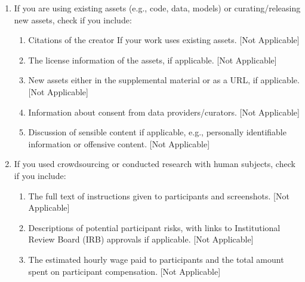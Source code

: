 \documentclass[twoside]{article}
\theoremstyle{plain}
\theoremstyle{definition}
\theoremstyle{plain}
\begin{document}
\begin{enumerate}
  \item If you are using existing assets (e.g., code, data, models) or curating/releasing new assets, check if you include:
  \begin{enumerate}
    \item Citations of the creator If your work uses existing assets. [Not Applicable]
    \item The license information of the assets, if applicable. [Not Applicable]
    \item New assets either in the supplemental material or as a URL, if applicable. [Not Applicable]
    \item Information about consent from data providers/curators. [Not Applicable]
    \item Discussion of sensible content if applicable, e.g., personally identifiable information or offensive content. [Not Applicable]
  \end{enumerate}

  \item If you used crowdsourcing or conducted research with human subjects, check if you include:
  \begin{enumerate}
    \item The full text of instructions given to participants and screenshots. [Not Applicable]
    \item Descriptions of potential participant risks, with links to Institutional Review Board (IRB) approvals if applicable. [Not Applicable]
    \item The estimated hourly wage paid to participants and the total amount spent on participant compensation. [Not Applicable]
  \end{enumerate}

\end{enumerate}



\clearpage
\appendix
\thispagestyle{empty}

\iffalse
\onecolumn
{}
\end{document}
